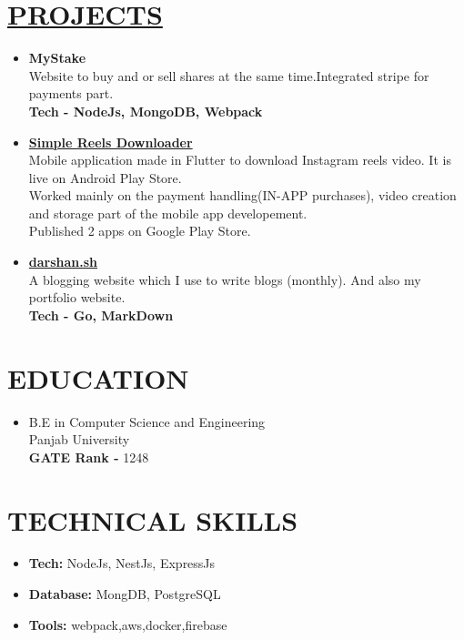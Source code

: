 \documentclass[line, margin, 12pt]{res}
\begin{document}
\begin{resume}
\section{\hyperref[https://www.github.com/darshansharma]{PROJECTS}}
\begin{itemize}
\item \textbf{{MyStake}}\\
Website to buy and or sell shares at the same time.Integrated stripe for payments part. \\
 \textbf{Tech - NodeJs,  MongoDB, Webpack}
\item \textbf{\href{https://play.google.com/store/apps/details?id=com.darshansharma.simple_reels_downloader}{Simple Reels Downloader}}\\
Mobile application made in Flutter to download Instagram reels video. It is live on Android Play Store.\\
Worked mainly on the payment handling(IN-APP purchases), video creation and storage part of the mobile app developement.\\
Published 2 apps on Google Play Store.\\
\item \textbf{\href{https://darshan.sh}{darshan.sh }}\\
A blogging website which I use to write blogs (monthly). And also my portfolio website. \\
 \textbf{Tech - Go, MarkDown}
\end{itemize}

\section{EDUCATION}
\begin{itemize}
\item B.E in Computer Science and Engineering \\
 Panjab University \\
\textbf{GATE Rank -} 1248
\end{itemize}

\section{TECHNICAL SKILLS}
\begin{itemize}
\item \textbf{Tech:} NodeJs, NestJs, ExpressJs
\item \textbf{Database:} MongDB, PostgreSQL
\item \textbf{Tools:} webpack,aws,docker,firebase
\end{itemize}

\end{resume}
\end{document}
